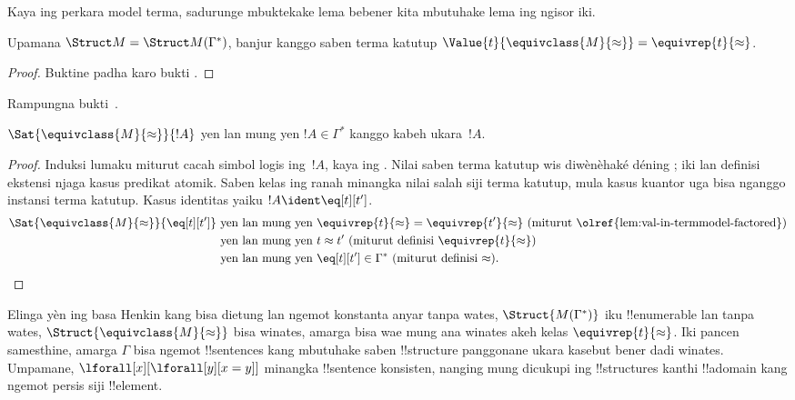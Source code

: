 \documentclass[../../../include/open-logic-section]{subfiles}
\begin{document}
Kaya ing perkara model terma, sadurunge mbuktekake lema bebener kita
mbutuhake lema ing ngisor iki.

\begin{lem}
 Upamana $\Struct M = \Struct M
 (\Gamma^*)$, banjur kanggo saben terma katutup
$\Value{t}{\equivclass{M}{\approx}} = \equivrep{t}
 {\approx}$.
\end{lem}
\begin{proof}
Buktine padha karo bukti .
\end{proof}

\begin{prob}
Rampungna bukti~.
\end{prob}

\begin{lem}
$\Sat{\equivclass{M}{\approx}}{!A}$ yen lan mung yen $!A \in
\Gamma^*$ kanggo kabeh ukara~$!A$.
\end{lem}

\begin{proof}
Induksi lumaku miturut cacah simbol logis ing~$!A$, kaya ing
. Nilai saben terma katutup wis diwènèhaké déning
; iki lan definisi ekstensi
njaga kasus predikat atomik. Saben kelas ing ranah minangka nilai salah siji terma katutup,
mula kasus kuantor uga bisa nganggo instansi terma katutup.
Kasus identitas yaiku $!A \ident \eq[t][t']$.
\begin{align*}
\Sat{\equivclass{M}{\approx}}{\eq[t][t']} & \text{ yen lan mung yen } \equivrep{t}{\approx} = \equivrep{t'}{\approx}
\text{ (miturut \olref{lem:val-in-termmodel-factored})}\\
& \text{ yen lan mung yen } t \approx t' \text{ (miturut definisi $\equivrep{t}{\approx}$)}\\
& \text{ yen lan mung yen } \eq[t][t'] \in \Gamma^* \text{ (miturut definisi $\approx$).}
\end{align*}
\end{proof}

\begin{digress}
Elinga yèn ing basa Henkin kang bisa dietung lan ngemot konstanta anyar tanpa wates,
$\Struct{M(\Gamma^*)}$ iku !!{enumerable} lan
tanpa wates, $\Struct{\equivclass{M}{\approx}}$ bisa winates, amarga
bisa wae mung ana winates akeh kelas $\equivrep{t}{\approx}$. Iki
pancen samesthine, amarga $\Gamma$ bisa ngemot !!{sentence}s kang
mbutuhake saben !!{structure} panggonane ukara kasebut bener dadi
winates. Umpamane, $\lforall[x][\lforall[y][x = y]]$ minangka
!!{sentence} konsisten, nanging mung dicukupi ing !!{structure}s kanthi
!!a{domain} kang ngemot persis siji !!{element}.
\end{digress}
\end{document}
